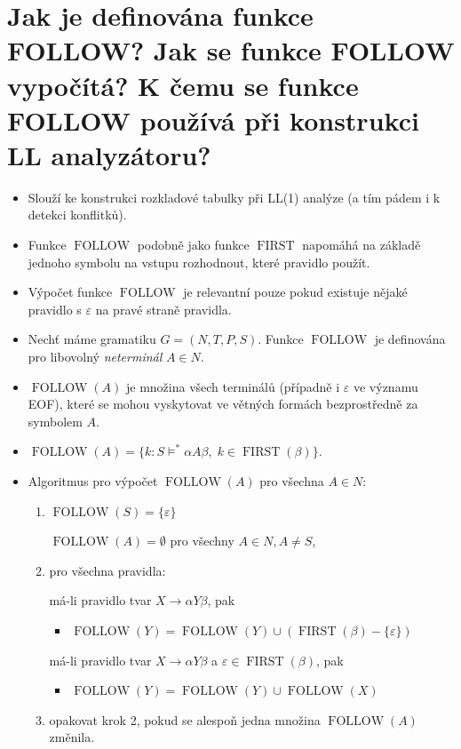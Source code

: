 \documentclass{article}
\begin{document}
\section{Jak je definována funkce FOLLOW? Jak se funkce FOLLOW vypočítá? K čemu se funkce FOLLOW používá při konstrukci LL analyzátoru?}
\begin{itemize}
\item Slouží ke konstrukci rozkladové tabulky  při LL(1) analýze (a tím pádem i k detekci konflitků).
\item Funkce $\operatorname{FOLLOW}$ podobně jako funkce $\operatorname{FIRST}$ napomáhá na základě jednoho symbolu na vstupu rozhodnout, které pravidlo použít.
\item Výpočet funkce $\operatorname{FOLLOW}$ je relevantní pouze pokud existuje nějaké pravidlo s $\varepsilon$ na pravé straně pravidla.
\item Nechť máme gramatiku $ G = (N, T, P, S) $. Funkce $\operatorname{FOLLOW}$ je definována pro libovolný \emph{neterminál} $A \in N$.
\item $\operatorname{FOLLOW}(A)$ je množina všech terminálů (případně i $\varepsilon$ ve významu EOF), které se mohou vyskytovat ve větných formách bezprostředně za symbolem $A$.
\item $\operatorname{FOLLOW}(A)= \{ k : S \models^* \alpha A \beta,\; k \in\operatorname{FIRST}(\beta)\}$.
  \item Algoritmus pro výpočet $\operatorname{FOLLOW}(A)$ pro všechna $A\in N$:
  \begin{enumerate}
    \item  $\operatorname{FOLLOW}(S) = \{ \varepsilon\}$
    
     $\operatorname{FOLLOW}(A) = \emptyset$ pro všechny $A\in N, A \neq S$,
    \item pro všechna pravidla:
    
    má-li pravidlo tvar $ X \rightarrow \alpha Y \beta$, pak
    \begin{itemize}
        \item $\operatorname{FOLLOW}(Y) =\operatorname{FOLLOW}(Y) \cup (\operatorname{FIRST}(\beta) - \{ \varepsilon\})$
    \end{itemize}
    
    má-li pravidlo tvar $ X \rightarrow \alpha Y \beta$ a $\varepsilon \in \operatorname{FIRST}(\beta)$, pak
    \begin{itemize}
        \item $\operatorname{FOLLOW}(Y) =\operatorname{FOLLOW}(Y) \cup \operatorname{FOLLOW}(X)$
    \end{itemize}

    \item opakovat krok 2, pokud se alespoň jedna množina $\operatorname{FOLLOW}(A)$ změnila.
    \end{enumerate}
\end{itemize}
\newpage
\end{document}
